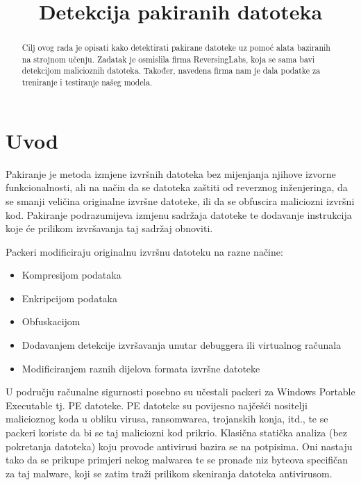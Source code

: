 \documentclass[conference]{IEEEtran}
\begin{document}
\title{Detekcija pakiranih datoteka\\
}
\author{
}

\maketitle

\begin{abstract}
Cilj ovog rada je opisati kako detektirati pakirane datoteke uz pomoć alata baziranih na strojnom učenju. Zadatak je osmislila firma ReversingLabs, koja se sama bavi detekcijom malicioznih datoteka. Također, navedena firma nam je dala podatke za treniranje i testiranje našeg modela.
\end{abstract}



\section{Uvod}
Pakiranje je metoda izmjene izvršnih datoteka bez mijenjanja njihove izvorne funkcionalnosti,
ali na način da se datoteka zaštiti od reverznog inženjeringa, da se smanji veličina originalne
izvršne datoteke, ili da se obfuscira maliciozni izvršni kod. Pakiranje podrazumijeva izmjenu
sadržaja datoteke te dodavanje instrukcija koje će prilikom izvršavanja taj sadržaj obnoviti.

Packeri 
modificiraju originalnu izvršnu datoteku na razne načine:
\begin{itemize}
\item Kompresijom podataka
\item Enkripcijom podataka
\item Obfuskacijom
\item Dodavanjem detekcije izvršavanja unutar debuggera ili virtualnog računala
\item Modificiranjem raznih dijelova formata izvršne datoteke
\end{itemize}

U području računalne sigurnosti posebno su učestali packeri za Windows Portable Executable tj. PE datoteke.
PE datoteke su povijesno najčešći nositelji malicioznog koda u 
obliku virusa, ransomwarea, trojanskih konja, itd., te se packeri koriste da bi se taj maliciozni kod prikrio. Klasična statička analiza 
(bez pokretanja datoteka) koju provode antivirusi bazira se na potpisima.
Oni nastaju tako da se prikupe primjeri nekog malwarea te se pronađe niz byteova specifičan za taj malware, 
koji se zatim traži prilikom skeniranja datoteka antivirusom.
\end{document}
